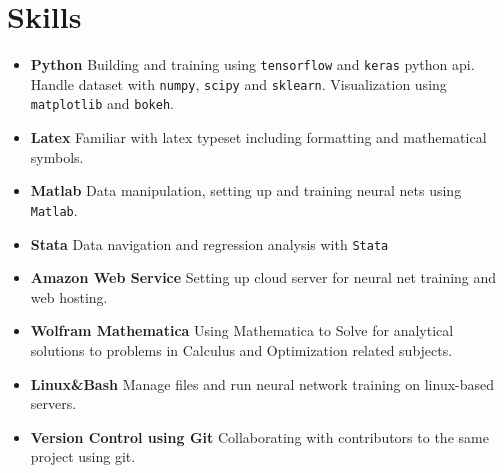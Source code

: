 \documentclass[a4paper,10pt]{article}
\begin{document}


\section{Skills}
	\begin{itemize}
    \item \textbf{Python} Building and training using \texttt{tensorflow} and \texttt{keras} python api. Handle dataset with \texttt{numpy}, \texttt{scipy} and \texttt{sklearn}. Visualization using \texttt{matplotlib} and \texttt{bokeh}. 
    \item \textbf{Latex} Familiar with latex typeset including formatting and mathematical symbols. 
    \item \textbf{Matlab} Data manipulation, setting up and training neural nets using \texttt{Matlab}. 
    \item \textbf{Stata} Data navigation and regression analysis with \texttt{Stata} 
	\item \textbf{Amazon Web Service} Setting up cloud server for neural net training and web hosting. 
    \item \textbf{Wolfram Mathematica} Using Mathematica to Solve for analytical solutions to problems in Calculus and Optimization related subjects.
    \item \textbf{Linux\&Bash} Manage files and run neural network training on linux-based servers.
    \item \textbf{Version Control using Git} Collaborating with contributors to the same project using git.
   	\end{itemize}
\end{document}
